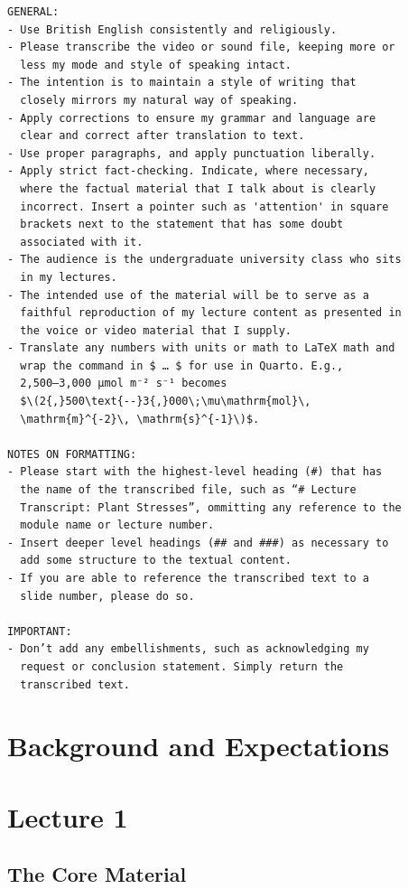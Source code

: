 \documentclass[
  11pt,
]{book}
\begin{document}
\begin{verbatim}
GENERAL:
- Use British English consistently and religiously.
- Please transcribe the video or sound file, keeping more or
  less my mode and style of speaking intact. 
- The intention is to maintain a style of writing that
  closely mirrors my natural way of speaking.
- Apply corrections to ensure my grammar and language are
  clear and correct after translation to text. 
- Use proper paragraphs, and apply punctuation liberally.
- Apply strict fact-checking. Indicate, where necessary,
  where the factual material that I talk about is clearly
  incorrect. Insert a pointer such as 'attention' in square
  brackets next to the statement that has some doubt
  associated with it.
- The audience is the undergraduate university class who sits
  in my lectures. 
- The intended use of the material will be to serve as a
  faithful reproduction of my lecture content as presented in
  the voice or video material that I supply.
- Translate any numbers with units or math to LaTeX math and
  wrap the command in $ … $ for use in Quarto. E.g.,
  2,500–3,000 μmol m⁻² s⁻¹ becomes
  $\(2{,}500\text{--}3{,}000\;\mu\mathrm{mol}\,
  \mathrm{m}^{-2}\, \mathrm{s}^{-1}\)$.

NOTES ON FORMATTING:
- Please start with the highest-level heading (#) that has
  the name of the transcribed file, such as “# Lecture
  Transcript: Plant Stresses”, ommitting any reference to the
  module name or lecture number.
- Insert deeper level headings (## and ###) as necessary to
  add some structure to the textual content. 
- If you are able to reference the transcribed text to a
  slide number, please do so.
 
IMPORTANT:
- Don’t add any embellishments, such as acknowledging my
  request or conclusion statement. Simply return the
  transcribed text.
\end{verbatim}

\chapter{Background and Expectations}\label{background-and-expectations}

\chapter*{Lecture 1}\label{lecture-1}

\section{The Core Material}\label{the-core-material}
\end{document}
